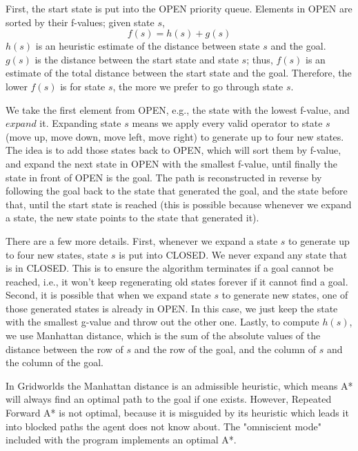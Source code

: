 \documentclass[letterpaper,11pt]{article}
\begin{document}
First, the start state is put into the OPEN priority queue. Elements in OPEN
are sorted by their f-values; given state $s$,
\begin{equation}f(s) = h(s) + g(s)\end{equation}
$h(s)$ is an heuristic estimate of the distance between state $s$ and the goal.
$g(s)$ is the distance between the start state and state $s$; thus, $f(s)$ is
an estimate of the total distance between the start state and the goal.
Therefore, the lower $f(s)$ is for state $s$, the more we prefer to go through
state $s$. 

We take the first element from OPEN, e.g., the state with the lowest f-value,
and $expand$ it. Expanding state $s$ means we apply every valid operator to
state $s$ (move up, move down, move left, move right) to generate up to four
new states. The idea is to add those states back to OPEN, which will sort them
by f-value, and expand the next state in OPEN with the smallest f-value, until
finally the state in front of OPEN is the goal. The path is reconstructed in
reverse by following the goal back to the state that generated the goal, and
the state before that, until the start state is reached (this is possible
because whenever we expand a state, the new state points to the state that
generated it).

There are a few more details. First, whenever we expand a state $s$ to generate
up to four new states, state $s$ is put into CLOSED. We never expand any state
that is in CLOSED. This is to ensure the algorithm terminates if a goal cannot
be reached, i.e., it won't keep regenerating old states forever if it cannot
find a goal. Second, it is possible that when we expand state $s$ to generate
new states, one of those generated states is already in OPEN. In this case, we
just keep the state with the smallest g-value and throw out the other one.
Lastly, to compute $h(s)$, we use Manhattan distance, which is the sum of the
absolute values of the distance between the row of $s$ and the row of the goal,
and the column of $s$ and the column of the goal.

In Gridworlds the Manhattan distance is an admissible heuristic, which means A*
will always find an optimal path to the goal if one exists. However, Repeated
Forward A* is not optimal, because it is misguided by its heuristic which leads
it into blocked paths the agent does not know about. The "omniscient mode"
included with the program implements an optimal A*.
\end{document}
